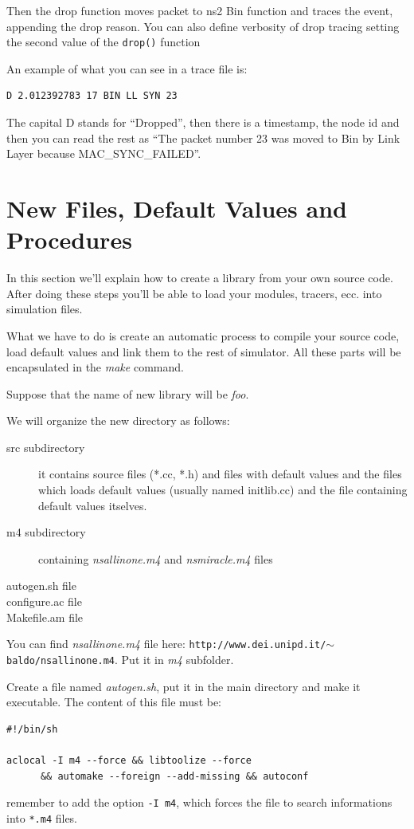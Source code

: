 \documentclass[a4paper,10pt]{article}
\begin{document}
Then the drop function moves packet to ns2 Bin function and traces the event, appending the drop reason. You can also define verbosity of drop tracing setting the second value of the \verb=drop()= function

An example of what you can see in a trace file is:
\begin{verbatim}
D 2.012392783 17 BIN LL SYN 23
\end{verbatim}

The capital D stands for ``Dropped'', then there is a timestamp, the node id and then you can read the rest as ``The packet number 23 was moved to Bin by Link Layer because MAC\_SYNC\_FAILED''.


\section{New Files, Default Values and Procedures}\label{makefile}

In this section we'll explain how to create a library from your own source code. After doing these steps you'll be able to load your modules, tracers, ecc. into simulation files.

What we have to do is create an automatic process to compile your source code, load default values and link them to the rest of simulator. All these parts will be encapsulated in the \emph{make} command.

Suppose that the name of new library will be \emph{foo}.

We will organize the new directory as follows:
\begin{description}
 \item[src subdirectory] it contains source files (*.cc, *.h) and files with default values and the files which loads default values (usually named initlib.cc) and the file containing default values itselves.
 \item[m4 subdirectory] containing \emph{nsallinone.m4} and \emph{nsmiracle.m4} files
 \item[autogen.sh file]
 \item[configure.ac file]
 \item[Makefile.am file]
\end{description}

You can find \emph{nsallinone.m4} file here: \texttt{http://www.dei.unipd.it/$\sim$baldo/nsallinone.m4}. Put it in \emph{m4} subfolder.

Create a file named \emph{autogen.sh}, put it in the main directory and make it executable. The content of this file must be:
\begin{verbatim}
#!/bin/sh

aclocal -I m4 --force && libtoolize --force
      && automake --foreign --add-missing && autoconf
\end{verbatim}
remember to add the option \verb=-I m4=, which forces the file to search informations into \verb=*.m4= files.
\end{document}
